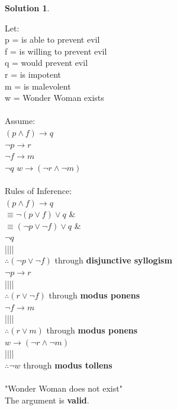 \documentclass{article}
\theoremstyle{definition}
\newtheorem*{solution}{Solution}
\begin{document}
\begin{solution}\ \\
\begin{compactenum}
Let:\ \\ p = is able to prevent evil\ \\
f = is willing to prevent evil\ \\
q = would prevent evil\ \\
r = is impotent\ \\
m = is malevolent\ \\
w = Wonder Woman exists\ \\
\ \\
Assume: \ \\ 
$(p \wedge f) \to q$\ \\
$\neg p \to r$\ \\
$\neg f \to m$\ \\
$\neg q$
$w \to (\neg r \wedge \neg m)$\ \\
\ \\
Rules of Inference:\ \\
$(p \wedge f) \to q$\ \\
$\equiv \neg(p \vee  f) \vee q$ & \ \\
$\equiv (\neg p \vee \neg f)\vee q$ & \ \\
$\neg q$\ \\
|||| \ \\
$\therefore (\neg p \vee \neg f)$ through \textbf{disjunctive syllogism}\ \\
$\neg p \to r$\ \\
||||\ \\
$\therefore (r \vee \neg f)$ through \textbf{modus ponens}\ \\
$\neg f \to m$\ \\
||||\ \\
$\therefore (r \vee m) $ through \textbf{modus ponens}\ \\
$w \to (\neg r \wedge \neg m)$\ \\
||||\ \\
$\therefore \neg w $ through \textbf{modus tollens}\ \\ \\

"Wonder Woman does not exist"\ \\
The argument is \textbf{valid}.\ \\

\end{compactenum}
\end{solution}
\end{document}
